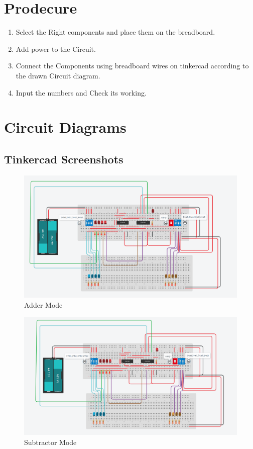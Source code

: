 \documentclass[11pt]{article}
\begin{document}
\section{Prodecure}
\begin{enumerate}
	\item Select the Right components and place them on the breadboard.
	\item Add power to the Circuit.
	\item Connect the Components using breadboard wires on tinkercad according to the drawn Circuit diagram.
	\item Input the numbers and Check its working.
\end{enumerate}

\section{Circuit Diagrams}
\subsection{Tinkercad Screenshots}
\begin{figure}[H]
\centering
\includegraphics[scale=0.5]{tinkercad 1.png}
\caption{Adder Mode}
\end{figure}

\begin{figure}[H]
\centering
\includegraphics[scale=0.48]{tinkercad 2.png}
\caption{Subtractor Mode}
\end{figure}
\end{document}
